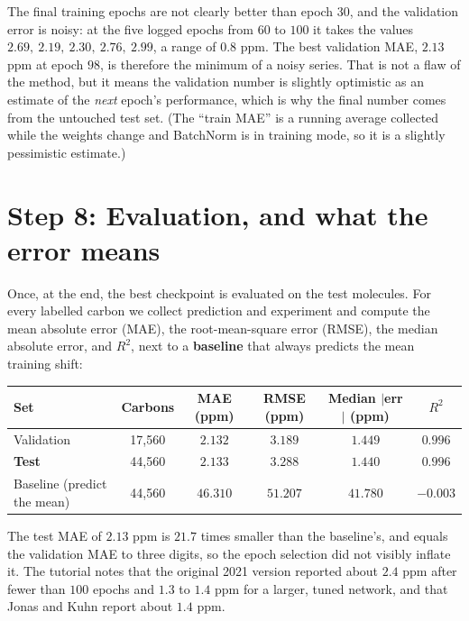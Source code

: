 \documentclass[11pt]{article}
\begin{document}
The final training epochs are not clearly better than epoch $30$, and the validation error is noisy: at the five logged epochs from $60$ to $100$ it takes the values $2.69,\ 2.19,\ 2.30,\ 2.76,\ 2.99$, a range of $0.8$ ppm. The best validation MAE, $2.13$ ppm at epoch $98$, is therefore the minimum of a noisy series. That is not a flaw of the method, but it means the validation number is slightly optimistic as an estimate of the \emph{next} epoch's performance, which is why the final number comes from the untouched test set. (The ``train MAE'' is a running average collected while the weights change and BatchNorm is in training mode, so it is a slightly pessimistic estimate.)

\section{Step 8: Evaluation, and what the error means}
Once, at the end, the best checkpoint is evaluated on the test molecules. For every labelled carbon we collect prediction and experiment and compute the mean absolute error (MAE), the root-mean-square error (RMSE), the median absolute error, and $R^2$, next to a \textbf{baseline} that always predicts the mean training shift:

\begin{center}
\small
\begin{tabular}{@{}lccccc@{}}
\toprule
Set & Carbons & MAE (ppm) & RMSE (ppm) & Median $|$err$|$ (ppm) & $R^2$\\
\midrule
Validation & 17{,}560 & $2.132$ & $3.189$ & $1.449$ & $0.996$\\
\textbf{Test} & 44{,}560 & $\mathbf{2.133}$ & $3.288$ & $1.440$ & $0.996$\\
Baseline (predict the mean) & 44{,}560 & $46.310$ & $51.207$ & $41.780$ & $-0.003$\\
\bottomrule
\end{tabular}
\end{center}

The test MAE of $2.13$ ppm is $21.7$ times smaller than the baseline's, and equals the validation MAE to three digits, so the epoch selection did not visibly inflate it. The tutorial notes that the original 2021 version reported about $2.4$ ppm after fewer than $100$ epochs and $1.3$ to $1.4$ ppm for a larger, tuned network, and that Jonas and Kuhn report about $1.4$ ppm.
\end{document}
